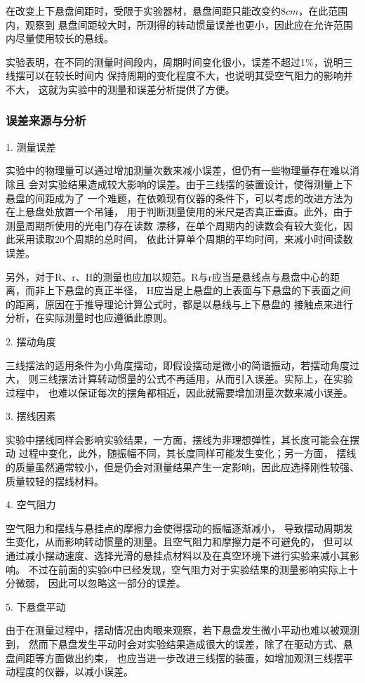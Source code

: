 \documentclass[12pt,hyperref,a4paper,UTF8]{ctexart}
\begin{document}
在改变上下悬盘间距时，受限于实验器材，悬盘间距只能改变约$8cm$，在此范围内，观察到
悬盘间距较大时，所测得的转动惯量误差也更小，因此应在允许范围内尽量使用较长的悬线。

实验表明，在不同的测量时间段内，周期时间变化很小，误差不超过1\%，说明三线摆可以在较长时间内
保持周期的变化程度不大，也说明其受空气阻力的影响并不大，
这就为实验中的测量和误差分析提供了方便。

\subsubsection{误差来源与分析}

1. 测量误差

实验中的物理量可以通过增加测量次数来减小误差，但仍有一些物理量存在难以消除且
会对实验结果造成较大影响的误差。由于三线摆的装置设计，使得测量上下悬盘的间距成为了
一个难题，在依赖现有仪器的条件下，可以考虑的改进方法为在上悬盘处放置一个吊锤，
用于判断测量使用的米尺是否真正垂直。此外，由于测量周期所使用的光电门存在读数
漂移，在单个周期内的读数会有较大变化，因此采用读取20个周期的总时间，
依此计算单个周期的平均时间，来减小时间读数误差。

另外，对于R、r、H的测量也应加以规范。R与r应当是悬线点与悬盘中心的距离，而非上下悬盘的真正半径，
H应当是上悬盘的上表面与下悬盘的下表面之间的距离，原因在于推导理论计算公式时，都是以悬线与上下悬盘的
接触点来进行分析，在实际测量时也应遵循此原则。

2. 摆动角度

三线摆法的适用条件为小角度摆动，即假设摆动是微小的简谐振动，若摆动角度过大，
则三线摆法计算转动惯量的公式不再适用，从而引入误差。实际上，在实验过程中，
也难以保证每次的摆角都相近，因此就需要增加测量次数来减小误差。

3. 摆线因素

实验中摆线同样会影响实验结果，一方面，摆线为非理想弹性，其长度可能会在摆动
过程中变化，此外，随振幅不同，其长度同样可能发生变化；另一方面，
摆线的质量虽然通常较小，但是仍会对测量结果产生一定影响，因此应选择刚性较强、质量较轻的摆线材料。

4. 空气阻力

空气阻力和摆线与悬挂点的摩擦力会使得摆动的振幅逐渐减小，
导致摆动周期发生变化，从而影响转动惯量的测量。且空气阻力和摩擦力是不可避免的，
但可以通过减小摆动速度、选择光滑的悬挂点材料以及在真空环境下进行实验来减小其影响。
不过在前面的实验6中已经发现，空气阻力对于实验结果的测量影响实际上十分微弱，
因此可以忽略这一部分的误差。

5. 下悬盘平动

由于在测量过程中，摆动情况由肉眼来观察，若下悬盘发生微小平动也难以被观测到，
然而下悬盘发生平动时会对实验结果造成很大的误差，除了在驱动方式、悬盘间距等方面做出约束，
也应当进一步改进三线摆的装置，如增加观测三线摆平动程度的仪器，以减小误差。
\end{document}
